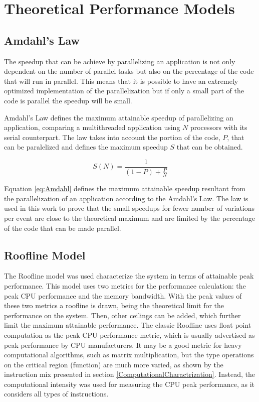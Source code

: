 \appendix
{}
\chapter{Theoretical Performance Models}

\section{Amdahl's Law}
\label{AmdahlsLaw}

The speedup that can be achieve by parallelizing an application is not only dependent on the number of parallel tasks but also on the percentage of the code that will run in parallel. This means that it is possible to have an extremely optimized implementation of the parallelization but if only a small part of the code is parallel the speedup will be small.

Amdahl's Law \cite{AMDAHL} defines the maximum attainable speedup of parallelizing an application, comparing a multithreaded application using $N$ processors with its serial counterpart. The law takes into account the portion of the code, $P$, that can be paralelized and defines the maximum speedup $S$ that can be obtained.

\begin{center}
	\begin{equation}
		S(N) = \frac{1}{(1 - P) + \frac{P}{N}}
		\label{eq:Amdahl}
	\end{equation}
\end{center}

Equation \ref{eq:Amdahl} defines the maximum attainable speedup resultant from the parallelization of an application according to the Amdahl's Law. The law is used in this work to prove that the small speedups for fewer number of variations per event are close to the theoretical maximum and are limited by the percentage of the code that can be made parallel.

\section{Roofline Model}
\label{App:Roofline}

The Roofline model \cite{Roofline} was used characterize the system in terms of attainable peak performance. This model uses two metrics for the performance calculation: the peak CPU performance and the memory bandwidth. With the peak values of these two metrics a roofline is drawn, being the theoretical limit for the performance on the system. Then, other ceilings can be added, which further limit the maximum attainable performance. The classic Roofline uses float point computation as the peak CPU performance metric, which is usually advertised as peak performance by CPU manufacturers. It may be a good metric for heavy computational algorithms, such as matrix multiplication, but the type operations on the critical region (\ttDilepKinFit function) are much more varied, as shown by the instruction mix presented in section \ref{ComputationalCharactrization}. Instead, the computational intensity was used for measuring the CPU peak performance, as it considers all types of instructions.

